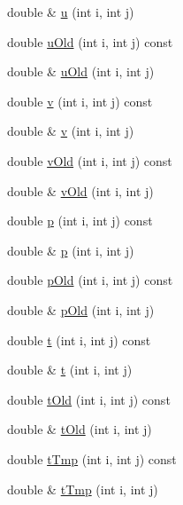 \begin{DoxyCompactItemize}
\item 
double \& \mbox{\hyperlink{classStaggeredGrid_a0ed62d6752b6b2b3ead5f654b515cd12}{u}} (int i, int j)
\item 
double \mbox{\hyperlink{classStaggeredGrid_a5368f026b37ca7d8f63e8b805b2b46b9}{u\+Old}} (int i, int j) const
\item 
double \& \mbox{\hyperlink{classStaggeredGrid_ac50464d9f8b1ee89eea4ad496e09dfd6}{u\+Old}} (int i, int j)
\item 
double \mbox{\hyperlink{classStaggeredGrid_ac052d8803ff950aee04b86ac026c516b}{v}} (int i, int j) const
\item 
double \& \mbox{\hyperlink{classStaggeredGrid_a7746f703f32c2f20a4c77246eebac697}{v}} (int i, int j)
\item 
double \mbox{\hyperlink{classStaggeredGrid_aa8a51f53c4b02d938bba9485e3708999}{v\+Old}} (int i, int j) const
\item 
double \& \mbox{\hyperlink{classStaggeredGrid_a585291cfec3161c849e1cd9fac4199d8}{v\+Old}} (int i, int j)
\item 
double \mbox{\hyperlink{classStaggeredGrid_aa6a5d99d9b4fbd9bd9cfa6ec071918f9}{p}} (int i, int j) const
\item 
double \& \mbox{\hyperlink{classStaggeredGrid_aa09a4ca67141589bae153797fbc4f3c5}{p}} (int i, int j)
\item 
double \mbox{\hyperlink{classStaggeredGrid_abf716a1e38d3c5f96b4d28fec19a35dd}{p\+Old}} (int i, int j) const
\item 
double \& \mbox{\hyperlink{classStaggeredGrid_afd6f66c4e032762078b9bc518f0bf478}{p\+Old}} (int i, int j)
\item 
double \mbox{\hyperlink{classStaggeredGrid_a477e8942e756cc2baecd1aaa5795bb3d}{t}} (int i, int j) const
\item 
double \& \mbox{\hyperlink{classStaggeredGrid_a30c69c5b8e2803a1e4d876f3942cecb1}{t}} (int i, int j)
\item 
double \mbox{\hyperlink{classStaggeredGrid_ad195fdf4e1ddb4eaf3a75eae717f7ab6}{t\+Old}} (int i, int j) const
\item 
double \& \mbox{\hyperlink{classStaggeredGrid_a9b0a18f93fba7aec2fd57066f67cc3bd}{t\+Old}} (int i, int j)
\item 
double \mbox{\hyperlink{classStaggeredGrid_a6fa8586d1216d7632af4af43596755ec}{t\+Tmp}} (int i, int j) const
\item 
double \& \mbox{\hyperlink{classStaggeredGrid_a92970d549989e22eaaa2163c7959043a}{t\+Tmp}} (int i, int j)
\item 

\end{DoxyCompactItemize}
